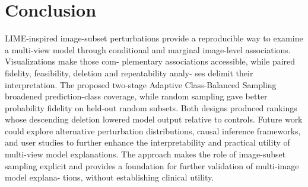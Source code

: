 \section{Conclusion}
LIME-inspired image-subset perturbations provide a reproducible way to examine a multi-view
model through conditional and marginal image-level associations. Visualizations make those com-
plementary associations accessible, while paired fidelity, feasibility, deletion and repeatability analy-
ses delimit their interpretation. The proposed two-stage Adaptive Class-Balanced Sampling broadened prediction-class coverage, while random sampling gave better probability fidelity on held-out random subsets. Both designs produced rankings whose descending deletion lowered model output relative to controls. Future work could explore alternative perturbation distributions, causal inference frameworks, and user studies to further enhance the interpretability and practical utility of multi-view model explanations. The approach makes the role of image-subset
sampling explicit and provides a foundation for further validation of multi-image model explana-
tions, without establishing clinical utility.


